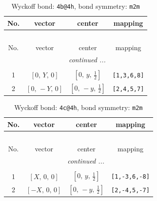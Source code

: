 \documentclass[fleqn,8pt]{jsarticle}
\begin{document}
\renewcommand{\arraystretch}{1.2}
\begin{longtable}{cccc}
\caption{Wyckoff bond: {\tt 4b@4h}, bond symmetry: {\tt m2m}}
 \\
 \hline \hline
No. & vector & center & mapping \\ \hline \endfirsthead

\multicolumn{3}{l}{\tablename\ \thetable{}} \\
 \hline \hline
No. & vector & center & mapping \\ \hline \endhead

 \hline \hline
\multicolumn{3}{r}{\footnotesize\it continued ...} \\ \endfoot

 \hline \hline
\multicolumn{3}{r}{} \\ \endlastfoot

1 & $\left[ 0,\, Y,\, 0 \right]$ & $\left[ 0,\, y,\, \frac{1}{2} \right]$ & {\tt [1,3,6,8]} \\ \hline
2 & $\left[ 0,\, - Y,\, 0 \right]$ & $\left[ 0,\, - y,\, \frac{1}{2} \right]$ & {\tt [2,4,5,7]} \\
\end{longtable}
\renewcommand{\arraystretch}{1.2}
\begin{longtable}{cccc}
\caption{Wyckoff bond: {\tt 4c@4h}, bond symmetry: {\tt m2m}}
 \\
 \hline \hline
No. & vector & center & mapping \\ \hline \endfirsthead

\multicolumn{3}{l}{\tablename\ \thetable{}} \\
 \hline \hline
No. & vector & center & mapping \\ \hline \endhead

 \hline \hline
\multicolumn{3}{r}{\footnotesize\it continued ...} \\ \endfoot

 \hline \hline
\multicolumn{3}{r}{} \\ \endlastfoot

1 & $\left[ X,\, 0,\, 0 \right]$ & $\left[ 0,\, y,\, \frac{1}{2} \right]$ & {\tt [1,-3,6,-8]} \\ \hline
2 & $\left[ - X,\, 0,\, 0 \right]$ & $\left[ 0,\, - y,\, \frac{1}{2} \right]$ & {\tt [2,-4,5,-7]} \\
\end{longtable}
\renewcommand{\arraystretch}{1.2}
\end{document}

